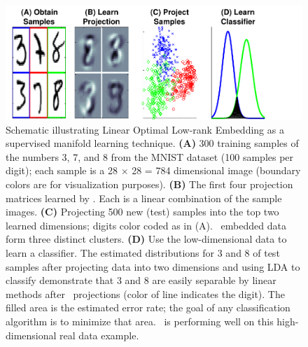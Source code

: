 \documentclass[10pt]{article}
\begin{document}
\begin{figure}
\centering %
\includegraphics{../Figs/mnist2.pdf} %
\caption{Schematic illustrating Linear Optimal Low-rank Embedding as a supervised manifold learning technique. 
\textbf{(A)} 300 training samples of the numbers 3, 7, and 8 from the MNIST dataset (100 samples per digit);  each sample is a 28 $\times$ 28 = 784 dimensional image (boundary colors are  for visualization purposes).
\textbf{(B)} The first four projection matrices learned by \Lol.  Each is a linear combination of the sample images.
\textbf{(C)} Projecting 500 new (test) samples into the top two learned dimensions;
 digits color coded as in (A). \Lol~embedded data form three distinct clusters.
\textbf{(D)}  Use the low-dimensional data to learn a classifier.  The estimated  distributions for 3 and 8 of test samples after
projecting data into two dimensions and using LDA to classify demonstrate that 3 and 8 are easily separable by linear methods after \Lol~projections (color of line indicates the digit).
The filled area is the estimated error rate; the goal of any classification algorithm is to minimize that area. \Lol~is performing well on this high-dimensional real data example.
}
\label{f:mnist}
\end{figure}
\end{document}
